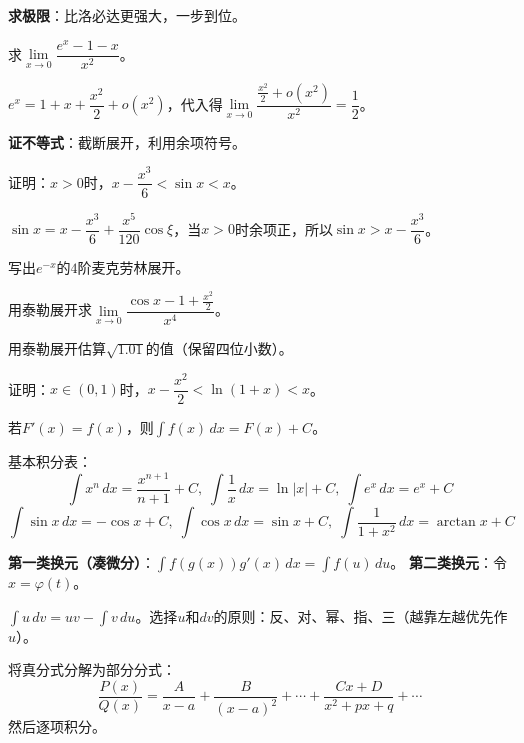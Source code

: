 \documentclass[a4paper,12pt]{ctexart}
\begin{document}
\textbf{求极限}：比洛必达更强大，一步到位。
\begin{example}
求$\lim\limits_{x\to0}\dfrac{e^x-1-x}{x^2}$。
\end{example}
\begin{solution}
$e^x=1+x+\dfrac{x^2}{2}+o(x^2)$，代入得$\lim\limits_{x\to0}\dfrac{\frac{x^2}{2}+o(x^2)}{x^2}=\dfrac12$。
\end{solution}

\textbf{证不等式}：截断展开，利用余项符号。
\begin{example}
证明：$x>0$时，$x-\dfrac{x^3}{6}<\sin x<x$。
\end{example}
\begin{solution}
$\sin x=x-\dfrac{x^3}{6}+\dfrac{x^5}{120}\cos\xi$，当$x>0$时余项正，所以$\sin x>x-\dfrac{x^3}{6}$。
\end{solution}


\begin{exercise}
\item 写出$e^{-x}$的$4$阶麦克劳林展开。
\item 用泰勒展开求$\lim\limits_{x\to0}\dfrac{\cos x-1+\frac{x^2}{2}}{x^4}$。
\item 用泰勒展开估算$\sqrt{1.01}$的值（保留四位小数）。
\item 证明：$x\in(0,1)$时，$x-\dfrac{x^2}{2}<\ln(1+x)<x$。
\end{exercise}

\newpage



若$F'(x)=f(x)$，则$\int f(x)\,dx=F(x)+C$。

基本积分表：
\[
\int x^n\,dx=\frac{x^{n+1}}{n+1}+C,\;
\int\frac1x\,dx=\ln|x|+C,\;
\int e^x\,dx=e^x+C
\]
\[
\int\sin x\,dx=-\cos x+C,\;
\int\cos x\,dx=\sin x+C,\;
\int\frac1{1+x^2}\,dx=\arctan x+C
\]


\textbf{第一类换元（凑微分）}：$\int f(g(x))g'(x)\,dx=\int f(u)\,du$。
\textbf{第二类换元}：令$x=\varphi(t)$。


$\int u\,dv=uv-\int v\,du$。选择$u$和$dv$的原则：反、对、幂、指、三（越靠左越优先作$u$）。


将真分式分解为部分分式：
\[
\frac{P(x)}{Q(x)} = \frac{A}{x-a}+\frac{B}{(x-a)^2}+\cdots+\frac{Cx+D}{x^2+px+q}+\cdots
\]
然后逐项积分。
\end{document}
